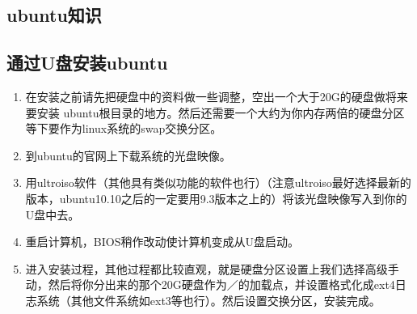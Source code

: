 \documentclass[12pt,oneside]{book}
\begin{document}
\setcounter{tocdepth}{2}    
\tableofcontents


\begin{common-format}
\mainmatter 

\chapter{ubuntu知识}
\section{通过U盘安装ubuntu}
\begin{enumerate}
\item  在安装之前请先把硬盘中的资料做一些调整，空出一个大于20G的硬盘做将来要安装 ubuntu根目录的地方。然后还需要一个大约为你内存两倍的硬盘分区等下要作为linux系统的swap交换分区。
\item 到ubuntu的官网上下载系统的光盘映像。
\item 用ultroiso软件（其他具有类似功能的软件也行）（注意ultroiso最好选择最新的版本，ubuntu10.10之后的一定要用9.3版本之上的）将该光盘映像写入到你的U盘中去。
\item 重启计算机，BIOS稍作改动使计算机变成从U盘启动。
\item 进入安装过程，其他过程都比较直观，就是硬盘分区设置上我们选择高级手动，然后将你分出来的那个20G硬盘作为／的加载点，并设置格式化成ext4日志系统（其他文件系统如ext3等也行）。然后设置交换分区，安装完成。
\end{enumerate}


\end{common-format}
\end{document}
